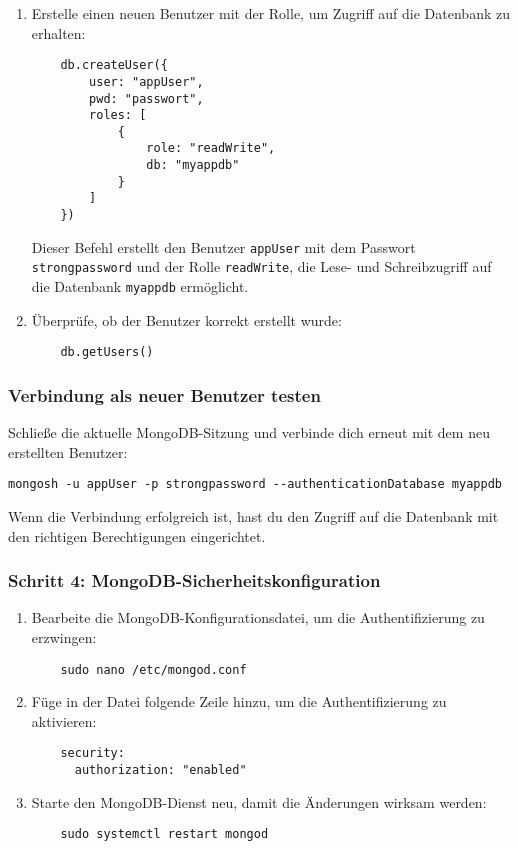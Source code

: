 \documentclass[a4paper,12pt]{article}
\begin{document}
\begin{enumerate}
    \item Erstelle einen neuen Benutzer mit der Rolle, um Zugriff auf die Datenbank zu erhalten:

    \begin{lstlisting}
    db.createUser({
        user: "appUser",
        pwd: "passwort",
        roles: [
            {
                role: "readWrite",
                db: "myappdb"
            }
        ]
    })
    \end{lstlisting}
    
    Dieser Befehl erstellt den Benutzer \texttt{appUser} mit dem Passwort \texttt{strongpassword} und der Rolle \texttt{readWrite}, die Lese- und Schreibzugriff auf die Datenbank \texttt{myappdb} ermöglicht.
    
    \item Überprüfe, ob der Benutzer korrekt erstellt wurde:

    \begin{lstlisting}
    db.getUsers()
    \end{lstlisting}
\end{enumerate}

\subsubsection{Verbindung als neuer Benutzer testen}
Schließe die aktuelle MongoDB-Sitzung und verbinde dich erneut mit dem neu erstellten Benutzer:

\begin{lstlisting}
mongosh -u appUser -p strongpassword --authenticationDatabase myappdb
\end{lstlisting}

Wenn die Verbindung erfolgreich ist, hast du den Zugriff auf die Datenbank mit den richtigen Berechtigungen eingerichtet.

\subsubsection{Schritt 4: MongoDB-Sicherheitskonfiguration}
\begin{enumerate}
    \item Bearbeite die MongoDB-Konfigurationsdatei, um die Authentifizierung zu erzwingen:

    \begin{lstlisting}
    sudo nano /etc/mongod.conf
    \end{lstlisting}
    
    \item Füge in der Datei folgende Zeile hinzu, um die Authentifizierung zu aktivieren:

    \begin{lstlisting}
    security:
      authorization: "enabled"
    \end{lstlisting}
    
    \item Starte den MongoDB-Dienst neu, damit die Änderungen wirksam werden:

    \begin{lstlisting}
    sudo systemctl restart mongod
    \end{lstlisting}
\end{enumerate}
\end{document}
